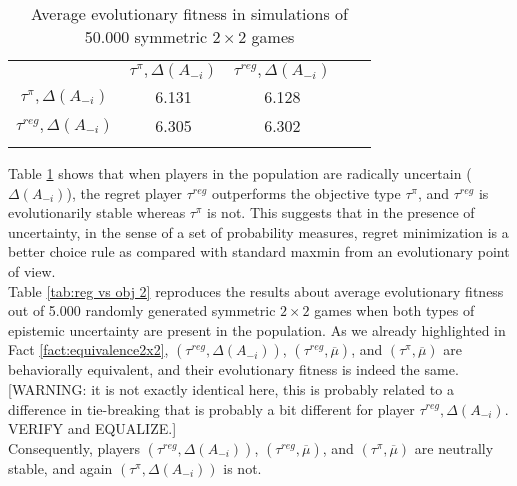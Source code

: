\documentclass[fleqn,reqno,11pt]{article}
\begin{document}
\begin{table}[]
\centering
\caption{Average evolutionary fitness in simulations of 50.000 symmetric $2 \times 2$ games}
\label{tab:reg vs obj}
\begin{tabular}{cccll}
\cline{1-3}
\multicolumn{1}{|c|}{} & \multicolumn{1}{c|}{$\tau^{\pi}, \Delta(A_{-i})$} & \multicolumn{1}{c|}{$\tau^{reg}, \Delta(A_{-i})$} &  &  \\ \cline{1-3}
\multicolumn{1}{|c|}{$\tau^{\pi}, \Delta(A_{-i})$} & \multicolumn{1}{c|}{6.131} & \multicolumn{1}{c|}{6.128} &  &  \\ \cline{1-3}
\multicolumn{1}{|c|}{$\tau^{reg}, \Delta(A_{-i})$} & \multicolumn{1}{c|}{6.305} & \multicolumn{1}{c|}{6.302} &  &  \\ \cline{1-3}
\multicolumn{1}{l}{}   & \multicolumn{1}{l}{}  & \multicolumn{1}{l}{}  &  & 
\end{tabular}
\end{table}


Table \ref{tab:reg vs obj} shows that when players in the population are radically uncertain ($\Delta(A_{-i})$), the regret player $ \tau^{reg} $ outperforms the objective type $  \tau^{\pi} $, and $ \tau^{reg} $  is evolutionarily stable whereas $ \tau^{\pi} $ is not. This suggests that in the presence of uncertainty, in the sense of a set of probability measures, regret minimization is a better choice rule as compared with standard maxmin from an evolutionary point of view. \\
\noindent Table \ref{tab:reg vs obj 2} reproduces the results about average evolutionary fitness out of 5.000 randomly generated symmetric $2 \times 2$ games when both types of epistemic uncertainty are present in the population. As we already highlighted in Fact \ref{fact:equivalence2x2}, $(\tau^{reg}, \Delta(A_{-i}))$, $(\tau^{reg}, \overline{\mu})$, and $(\tau^{\pi}, \overline{\mu})$ are behaviorally equivalent, and their evolutionary fitness is indeed the same. [WARNING: it is not exactly identical here, this is probably related to a difference in tie-breaking that is probably a bit different for player $\tau^{reg}, \Delta(A_{-i})$. VERIFY and EQUALIZE.]\\
Consequently, players $(\tau^{reg}, \Delta(A_{-i}))$, $(\tau^{reg}, \overline{\mu})$, and $(\tau^{\pi}, \overline{\mu})$ are neutrally stable, and again $(\tau^{\pi}, \Delta(A_{-i}))$ is not.
\end{document}
